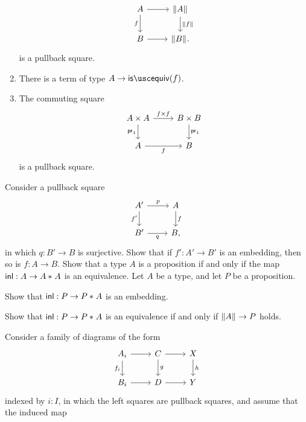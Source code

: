 \begin{exercises}
\begin{enumerate}
\begin{equation*}
\begin{tikzcd}
        A \arrow[d,swap,"f"] \arrow[r] & \brck{A} \arrow[d,"\brck{f}"] \\
        B \arrow[r] & \brck{B}.
      \end{tikzcd}
    \end{equation*}
    is a pullback square.
  \item There is a term of type $A\to\isequiv(f)$.
  \item The commuting square
    \begin{equation*}
      \begin{tikzcd}
        A\times A \arrow[r,"f\times f"] \arrow[d,swap,"\proj 1"] & B \times B \arrow[d,"\proj 1"] \\
        A \arrow[r,swap,"f"] & B
      \end{tikzcd}
    \end{equation*}
    is a pullback square. 
  \end{enumerate}
  \exercise Consider a pullback square
  \begin{equation*}
    \begin{tikzcd}
      A' \arrow[d,swap,"{f'}"] \arrow[r,"p"] & A \arrow[d,"f"] \\
      B' \arrow[r,swap,"q"] & B,
    \end{tikzcd}
  \end{equation*}
  in which $q:B'\to B$ is surjective. Show that if $f':A'\to B'$ is an embedding, then so is $f:A\to B$.
  \exercise Show that a type $A$ is a proposition if and only if the map ${\mathsf{inl}}:A\to {A}\ast_{}{A}$ is an equivalence.
  \exercise Let $A$ be a type, and let $P$ be a proposition.
  \begin{subexenum}
  \item Show that ${\mathsf{inl}}:P\to {P}\ast_{}{A}$ is an embedding.
  \item Show that ${\mathsf{inl}}:P\to {P}\ast_{}{A}$ is an equivalence if and only if $\Vert A\Vert_{}\to P$ holds.
  \end{subexenum}
  \exercise Consider a family of diagrams of the form
  \begin{equation*}
    \begin{tikzcd}
      A_i \arrow[r] \arrow[d,swap,"{f_i}"] &
      C \arrow[r] \arrow[d,"g"] & X \arrow[d,"h"] \\
      B_i \arrow[r] & D \arrow[r] & Y 
    \end{tikzcd}
  \end{equation*}
  indexed by $i:I$, in which the left squares are pullback squares,
  and assume that the induced map
  \begin{equation*}

\end{equation*}
\end{exercises}

